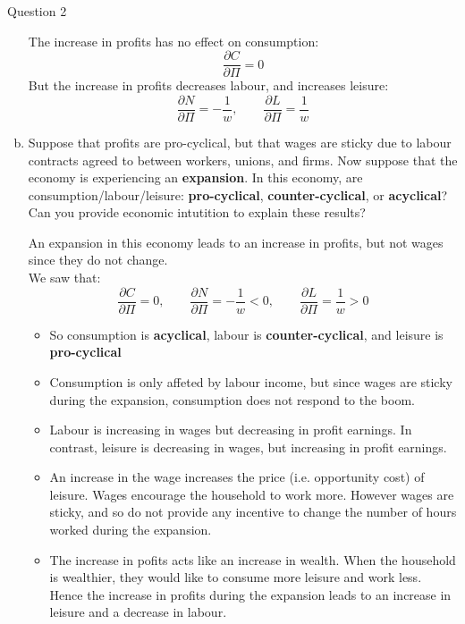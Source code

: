 \documentclass[a4paper]{article}
\begin{document}
\begin{questionbox}{Question 2}
\begin{enumerate}[(a)]
			\begin{explanationbox}
				The increase in profits has no effect on consumption:
				\[
					\frac{\partial C}{\partial \Pi} = 0
				\]
				But the increase in profits decreases labour, and increases leisure:
				\[
					\frac{\partial N}{\partial \Pi}= -\frac{1}{w}, \qquad \frac{\partial L}{\partial \Pi} = \frac{1}{w}
				\]
			\end{explanationbox}
			\item Suppose that profits are pro-cyclical, but that wages are sticky due to labour contracts agreed to between workers, unions, and firms. Now suppose that the economy is experiencing an \textbf{expansion}. In this economy, are consumption/labour/leisure: \textbf{pro-cyclical}, \textbf{counter-cyclical}, or \textbf{acyclical}? Can you provide economic intutition to explain these results?
			\begin{explanationbox}
				An expansion in this economy leads to an increase in profits, but not wages since they do not change.\\
				We saw that:
				\[
					\frac{\partial C}{\partial \Pi} = 0, \qquad \frac{\partial N}{\partial \Pi}= -\frac{1}{w} <0, \qquad \frac{\partial L}{\partial \Pi} = \frac{1}{w}>0
				\]
				\begin{itemize}
					\item So consumption is \textbf{acyclical}, labour is \textbf{counter-cyclical}, and leisure is \textbf{pro-cyclical}
					\item Consumption is only affeted by labour income, but since wages are sticky during the expansion, consumption does not respond to the boom.
				\end{itemize}
			\end{explanationbox}
			\begin{explanationbox}
				\begin{itemize}
					\item Labour is increasing in wages but decreasing in profit earnings. In contrast, leisure is decreasing in wages, but increasing in profit earnings.
					\item An increase in the wage increases the price (i.e. opportunity cost) of leisure. Wages encourage the household to work more. However wages are sticky, and so do not provide any incentive to change the number of hours worked during the expansion.
					\item The increase in pofits acts like an increase in wealth. When the household is wealthier, they would like to consume more leisure and work less. Hence the increase in profits during the expansion leads to an increase in leisure and a decrease in labour.
				\end{itemize}
			\end{explanationbox}
		\end{enumerate}
	\end{questionbox}
\end{document}
